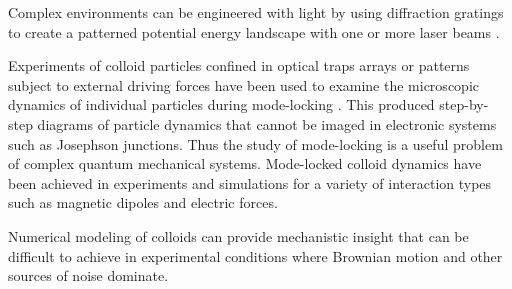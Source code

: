 \documentclass[twocolumn,preprintnumbers,amsmath,amssymb,aps,prx]{revtex4}
\begin{document}
Complex environments can be
engineered with light by %
using diffraction gratings to create a patterned
potential energy landscape 
with one or more laser beams \cite{}.
%

Experiments of colloid particles confined
in optical traps arrays or patterns 
subject to external driving forces 
have
been used to examine the microscopic dynamics
of individual particles during mode-locking \cite{Juniper2015}.
This produced step-by-step diagrams
of particle dynamics that cannot be 
imaged in electronic systems such as Josephson junctions.
Thus the study of
mode-locking is a useful problem
of complex quantum mechanical systems.
Mode-locked 
colloid dynamics have been achieved in 
experiments \cite{Juniper2015, Lutz2004} and
simulations \cite{Herrera-Velarde2007, Herrera-Velarde2008} 
for a variety of interaction types such as 
magnetic dipoles and electric forces.


Numerical modeling of colloids can provide mechanistic insight
that can be difficult to achieve in experimental conditions
where Brownian motion and other sources of noise dominate.
\end{document}
